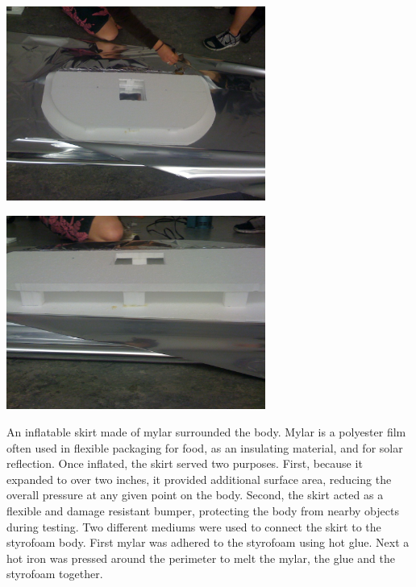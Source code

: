 \begin{minipage}{6.5in}
\begin{minipage}{6.5in}
\begin{minipage}{6.5in}
  \begin{center}
    \includegraphics[width=85mm]{imageSources/rigidity1.png}
  \end{center}
  \label{rigidity1}
\end{minipage}

\begin{minipage}{6.5in}
  \begin{center}
    \includegraphics[width=85mm]{imageSources/rigidity2.png}
  \end{center}
  \label{rigidity2}
\end{minipage}

An inflatable skirt made of mylar surrounded the body. Mylar is a polyester film often used in flexible packaging for food, as an insulating material, and for solar reflection. Once inflated, the skirt served two purposes. First, because it expanded to over two inches, it provided additional surface area, reducing the overall pressure at any given point on the body. Second, the skirt acted as a flexible and damage resistant bumper, protecting the body from nearby objects during testing. Two different mediums were used to connect the skirt to the styrofoam body. First mylar was adhered to the styrofoam using hot glue.  Next a hot iron was pressed around the perimeter to melt the mylar, the glue and the styrofoam together.


\end{minipage}
\end{minipage}
